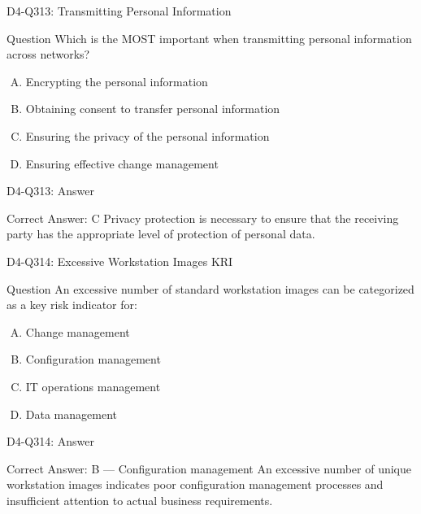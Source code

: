 \documentclass{beamer}
\begin{document}
	\begin{frame}{D4-Q313: Transmitting Personal Information}
		\begin{block}{Question}
			Which is the MOST important when transmitting personal information across networks?
		\end{block}
		\begin{enumerate}[(A)]
			\item Encrypting the personal information
			\item Obtaining consent to transfer personal information
			\item Ensuring the privacy of the personal information
			\item Ensuring effective change management
		\end{enumerate}
	\end{frame}
	\begin{frame}{D4-Q313: Answer}
		\begin{block}{Correct Answer: C}
			Privacy protection is necessary to ensure that the receiving party has the appropriate level of protection of personal data.
		\end{block}
	\end{frame}
	
	\begin{frame}{D4-Q314: Excessive Workstation Images KRI}
		\begin{block}{Question}
			An excessive number of standard workstation images can be categorized as a key risk indicator for:
		\end{block}
		\begin{enumerate}[(A)]
			\item Change management
			\item Configuration management
			\item IT operations management
			\item Data management
		\end{enumerate}
	\end{frame}
	\begin{frame}{D4-Q314: Answer}
		\begin{block}{Correct Answer: B --- Configuration management}
			An excessive number of unique workstation images indicates poor configuration management processes and insufficient attention to actual business requirements.
		\end{block}
	\end{frame}
	
\end{document}
